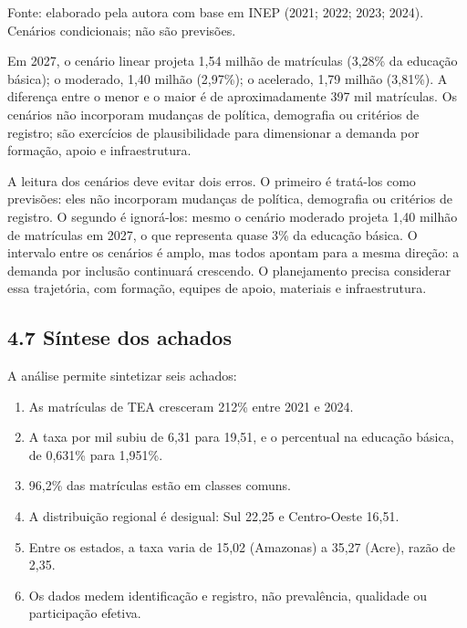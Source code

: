 \endgroup

Fonte: elaborado pela autora com base em INEP (2021; 2022; 2023; 2024).
Cenários condicionais; não são previsões.

Em 2027, o cenário linear projeta 1,54 milhão de matrículas (3,28\% da
educação básica); o moderado, 1,40 milhão (2,97\%); o acelerado, 1,79
milhão (3,81\%). A diferença entre o menor e o maior é de
aproximadamente 397 mil matrículas. Os cenários não incorporam mudanças
de política, demografia ou critérios de registro; são exercícios de
plausibilidade para dimensionar a demanda por formação, apoio e
infraestrutura.

A leitura dos cenários deve evitar dois erros. O primeiro é tratá-los
como previsões: eles não incorporam mudanças de política, demografia ou
critérios de registro. O segundo é ignorá-los: mesmo o cenário moderado
projeta 1,40 milhão de matrículas em 2027, o que representa quase 3\% da
educação básica. O intervalo entre os cenários é amplo, mas todos
apontam para a mesma direção: a demanda por inclusão continuará
crescendo. O planejamento precisa considerar essa trajetória, com
formação, equipes de apoio, materiais e infraestrutura.

\subsection{4.7 Síntese dos achados}\label{suxedntese-dos-achados}

A análise permite sintetizar seis achados:

\begin{enumerate}
\def\labelenumi{\arabic{enumi}.}
\tightlist
\item
  As matrículas de TEA cresceram 212\% entre 2021 e 2024.
\item
  A taxa por mil subiu de 6,31 para 19,51, e o percentual na educação
  básica, de 0,631\% para 1,951\%.
\item
  96,2\% das matrículas estão em classes comuns.
\item
  A distribuição regional é desigual: Sul 22,25 e Centro-Oeste 16,51.
\item
  Entre os estados, a taxa varia de 15,02 (Amazonas) a 35,27 (Acre),
  razão de 2,35.
\item
  Os dados medem identificação e registro, não prevalência, qualidade ou
  participação efetiva.
\end{enumerate}


